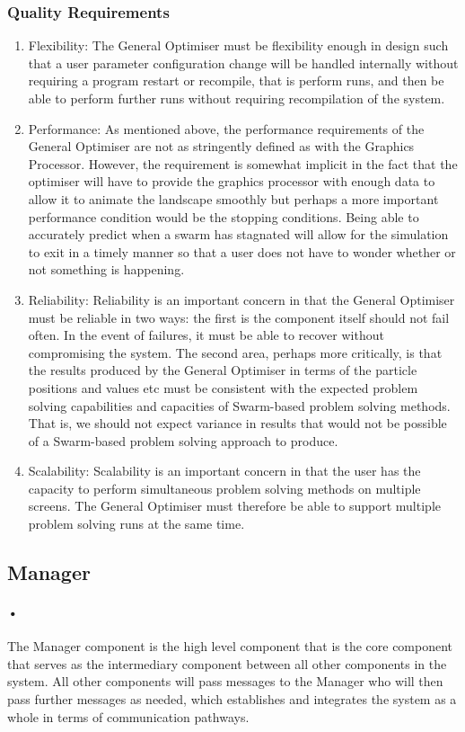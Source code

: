 \documentclass[11pt]{article}
\begin{document}
\subsubsection{Quality Requirements}
\begin{enumerate}
\item Flexibility: The General Optimiser must be flexibility enough in design such that a user parameter configuration change will be handled internally without requiring a program restart or recompile, that is perform runs, and then be able to perform further runs without requiring recompilation of the system.
\item Performance: As mentioned above, the performance requirements of the General Optimiser are not as stringently defined as with the Graphics Processor. However, the requirement is somewhat implicit in the fact that the optimiser will have to provide the graphics processor with enough data to allow it to animate the landscape smoothly but perhaps a more important performance condition would be the stopping conditions. Being able to accurately predict when a swarm has stagnated will allow for the simulation to exit in a timely manner so that a user does not have to wonder whether or not something is happening.
\item Reliability: Reliability is an important concern in that the General Optimiser must be reliable in two ways: the first is the component itself should not fail often. In the event of failures, it must be able to recover without compromising the system. The second area, perhaps more critically, is that the results produced by the General Optimiser in terms of the particle positions and values etc must be consistent with the expected problem solving capabilities and capacities of Swarm-based problem solving methods. That is, we should not expect variance in results that would not be possible of a Swarm-based problem solving approach to produce.
\item Scalability: Scalability is an important concern in that the user has the capacity to perform simultaneous problem solving methods on multiple screens. The General Optimiser must therefore be able to support multiple problem solving runs at the same time.
\end{enumerate}
\subsection{Manager}
\paragraph{•}
The Manager component is the high level component that is the core component that serves as the intermediary component between all other components in the system. All other components will pass messages to the Manager who will then pass further messages as needed, which establishes and integrates the system as a whole in terms of communication pathways.
\end{document}

